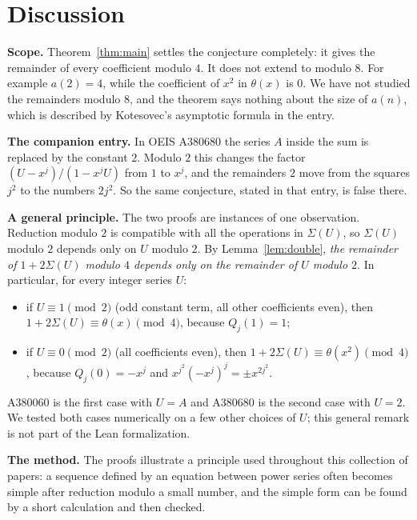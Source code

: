 \documentclass[11pt,a4paper]{article}
\theoremstyle{definition}
\theoremstyle{remark}
\newcommand{\para}[1]{\par\medskip\noindent\textbf{#1}\enspace}
\begin{document}
\section{Discussion}\label{sec:discussion}

\para{Scope.} Theorem~\ref{thm:main} settles the conjecture completely: it gives the remainder of every coefficient
modulo $4$. It does not extend to modulo $8$. For example $a(2)=4$, while the coefficient of $x^2$ in $\theta(x)$ is
$0$. We have not studied the remainders modulo $8$, and the theorem says nothing about the size of $a(n)$, which is
described by Kotesovec's asymptotic formula in the entry.

\para{The companion entry.} In OEIS A380680 the series $A$ inside the sum is replaced by the constant $2$. Modulo $2$
this changes the factor $(U-x^j)/(1-x^jU)$ from $1$ to $x^j$, and the remainders $2$ move from the squares $j^2$ to the
numbers $2j^2$. So the same conjecture, stated in that entry, is false there.

\para{A general principle.} The two proofs are instances of one observation. Reduction modulo $2$ is compatible with
all the operations in $\Sigma(U)$, so $\Sigma(U)$ modulo $2$ depends only on $U$ modulo $2$. By
Lemma~\ref{lem:double}, \emph{the remainder of $1+2\Sigma(U)$ modulo $4$ depends only on the remainder of $U$ modulo
$2$}. In particular, for every integer series $U$:
\begin{itemize}
\item if $U\equiv1\pmod2$ (odd constant term, all other coefficients even), then $1+2\Sigma(U)\equiv\theta(x)\pmod4$,
because $Q_j(1)=1$;
\item if $U\equiv0\pmod2$ (all coefficients even), then $1+2\Sigma(U)\equiv\theta(x^2)\pmod4$, because
$Q_j(0)=-x^j$ and $x^{j^2}(-x^j)^j=\pm x^{2j^2}$.
\end{itemize}
A380060 is the first case with $U=A$ and A380680 is the second case with $U=2$. We tested both cases numerically on
a few other choices of $U$; this general remark is not part of the Lean formalization.

\para{The method.} The proofs illustrate a principle used throughout this collection of papers: a sequence defined by
an equation between power series often becomes simple after reduction modulo a small number, and the simple form can
be found by a short calculation and then checked.
\end{document}

